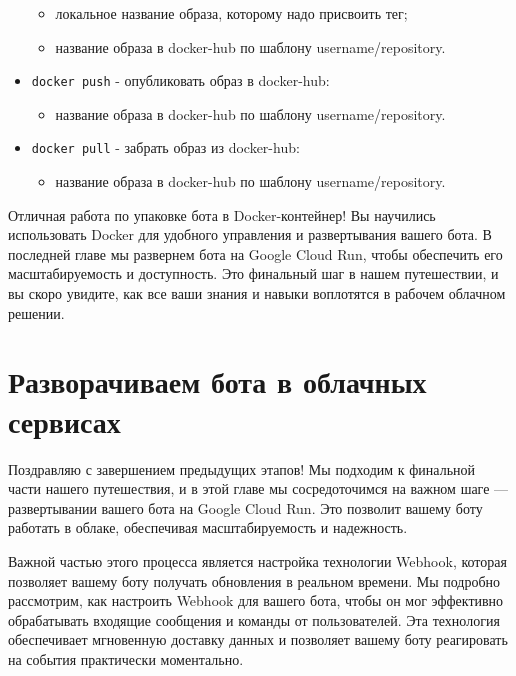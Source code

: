\documentclass[
]{book}
\providecommand{\tightlist}{%
  \setlength{\itemsep}{0pt}\setlength{\parskip}{0pt}}
\begin{document}
\begin{itemize}
  \begin{itemize}
  \tightlist
  \item
    локальное название образа, которому надо присвоить тег;
  \item
    название образа в docker-hub по шаблону username/repository.
  \end{itemize}
\item
  \texttt{docker\ push} - опубликовать образ в docker-hub:

  \begin{itemize}
  \tightlist
  \item
    название образа в docker-hub по шаблону username/repository.
  \end{itemize}
\item
  \texttt{docker\ pull} - забрать образ из docker-hub:

  \begin{itemize}
  \tightlist
  \item
    название образа в docker-hub по шаблону username/repository.
  \end{itemize}
\end{itemize}

Отличная работа по упаковке бота в Docker-контейнер! Вы научились использовать Docker для удобного управления и развертывания вашего бота. В последней главе мы развернем бота на Google Cloud Run, чтобы обеспечить его масштабируемость и доступность. Это финальный шаг в нашем путешествии, и вы скоро увидите, как все ваши знания и навыки воплотятся в рабочем облачном решении.

\chapter{Разворачиваем бота в облачных сервисах}\label{ux440ux430ux437ux432ux43eux440ux430ux447ux438ux432ux430ux435ux43c-ux431ux43eux442ux430-ux432-ux43eux431ux43bux430ux447ux43dux44bux445-ux441ux435ux440ux432ux438ux441ux430ux445}

Поздравляю с завершением предыдущих этапов! Мы подходим к финальной части нашего путешествия, и в этой главе мы сосредоточимся на важном шаге --- развертывании вашего бота на Google Cloud Run. Это позволит вашему боту работать в облаке, обеспечивая масштабируемость и надежность.

Важной частью этого процесса является настройка технологии Webhook, которая позволяет вашему боту получать обновления в реальном времени. Мы подробно рассмотрим, как настроить Webhook для вашего бота, чтобы он мог эффективно обрабатывать входящие сообщения и команды от пользователей. Эта технология обеспечивает мгновенную доставку данных и позволяет вашему боту реагировать на события практически моментально.
\end{document}
